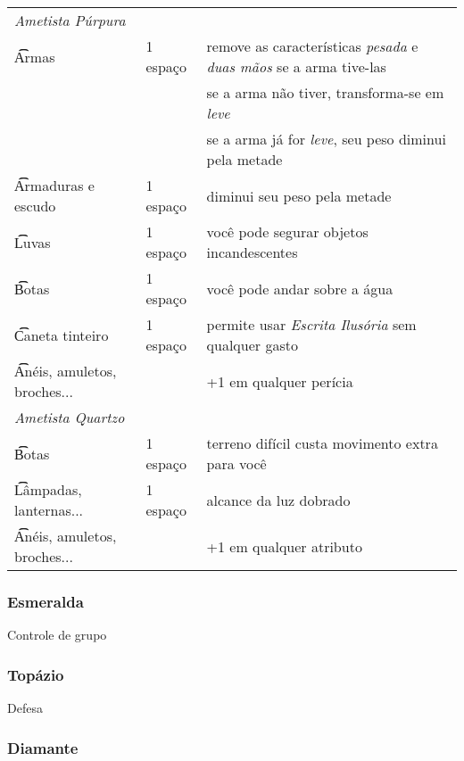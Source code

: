 \documentclass{RPG_Adventure}[2021/10/20]
\begin{document}
\begin{center}
\begin{longtable}{ m{6cm} m{2cm} m{8cm} }
    \multicolumn{2}{l}{\t\textit{Ametista Púrpura}} \\
    \t\t Armas & 1 espaço & remove as características \textit{pesada} e
    \textit{duas mãos} se a arma tive-las \\ && se a arma não tiver,
    transforma-se em \textit{leve} \\ && se a arma já for \textit{leve}, seu
    peso diminui pela metade \\ \hline
    \t\t Armaduras e escudo & 1 espaço & diminui seu peso pela metade \\ \hline
    \t\t Luvas & 1 espaço & você pode segurar objetos incandescentes \\ \hline
    \t\t Botas & 1 espaço & você pode andar sobre a água \\ \hline
    \t\t Caneta tinteiro & 1 espaço & permite usar \textit{Escrita Ilusória} sem
    qualquer gasto \\ \hline
    \t\t Anéis, amuletos, broches... && +1 em qualquer perícia \\
    \hline \hline

    \multicolumn{2}{l}{\t\textit{Ametista Quartzo}} \\
    \t\t Botas & 1 espaço & terreno difícil custa movimento extra para você \\
    \hline
    \t\t Lâmpadas, lanternas... & 1 espaço & alcance da luz dobrado \\
    \hline
    \t\t Anéis, amuletos, broches... &&  +1 em qualquer atributo \\
    \hline \hline

\end{longtable}
\end{center}

\subsubsection{Esmeralda}%

Controle de grupo

\subsubsection{Topázio}%

Defesa

\subsubsection{Diamante}%

\begin{multicols}{2}
\end{multicols}
\end{document}

